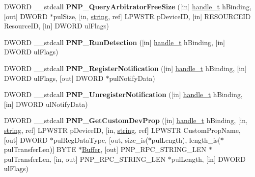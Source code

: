 \begin{DoxyCompactItemize}
D\+W\+O\+RD \+\_\+\+\_\+stdcall {\bfseries P\+N\+P\+\_\+\+Query\+Arbitrator\+Free\+Size} (\mbox{[}in\mbox{]} \hyperlink{interfacevoid}{handle\+\_\+t} h\+Binding, \mbox{[}out\mbox{]} D\+W\+O\+RD $\ast$pul\+Size, \mbox{[}in, \hyperlink{structstring}{string}, ref\mbox{]} L\+P\+W\+S\+TR p\+Device\+ID, \mbox{[}in\mbox{]} R\+E\+S\+O\+U\+R\+C\+E\+ID Resource\+ID, \mbox{[}in\mbox{]} D\+W\+O\+RD ul\+Flags)
\item 
\mbox{\label{interfacepnp_a20456871c401bdb3d2eae7e02f3ee990}} 
D\+W\+O\+RD \+\_\+\+\_\+stdcall {\bfseries P\+N\+P\+\_\+\+Run\+Detection} (\mbox{[}in\mbox{]} \hyperlink{interfacevoid}{handle\+\_\+t} h\+Binding, \mbox{[}in\mbox{]} D\+W\+O\+RD ul\+Flags)
\item 
\mbox{\label{interfacepnp_aacf7965e80e86b22e94cfae52a954480}} 
D\+W\+O\+RD \+\_\+\+\_\+stdcall {\bfseries P\+N\+P\+\_\+\+Register\+Notification} (\mbox{[}in\mbox{]} \hyperlink{interfacevoid}{handle\+\_\+t} h\+Binding, \mbox{[}in\mbox{]} D\+W\+O\+RD ul\+Flags, \mbox{[}out\mbox{]} D\+W\+O\+RD $\ast$pul\+Notify\+Data)
\item 
\mbox{\label{interfacepnp_adbd3a221383cc437b946b8b02bb6f25e}} 
D\+W\+O\+RD \+\_\+\+\_\+stdcall {\bfseries P\+N\+P\+\_\+\+Unregister\+Notification} (\mbox{[}in\mbox{]} \hyperlink{interfacevoid}{handle\+\_\+t} h\+Binding, \mbox{[}in\mbox{]} D\+W\+O\+RD ul\+Notify\+Data)
\item 
\mbox{\label{interfacepnp_ad13c56fdc1aa44c6a1a7736bd92b88ce}} 
D\+W\+O\+RD \+\_\+\+\_\+stdcall {\bfseries P\+N\+P\+\_\+\+Get\+Custom\+Dev\+Prop} (\mbox{[}in\mbox{]} \hyperlink{interfacevoid}{handle\+\_\+t} h\+Binding, \mbox{[}in, \hyperlink{structstring}{string}, ref\mbox{]} L\+P\+W\+S\+TR p\+Device\+ID, \mbox{[}in, \hyperlink{structstring}{string}, ref\mbox{]} L\+P\+W\+S\+TR Custom\+Prop\+Name, \mbox{[}out\mbox{]} D\+W\+O\+RD $\ast$pul\+Reg\+Data\+Type, \mbox{[}out, size\+\_\+is($\ast$pul\+Length), length\+\_\+is($\ast$pul\+Transfer\+Len)\mbox{]} B\+Y\+TE $\ast$\hyperlink{class_buffer}{Buffer}, \mbox{[}out\mbox{]} P\+N\+P\+\_\+\+R\+P\+C\+\_\+\+S\+T\+R\+I\+N\+G\+\_\+\+L\+EN $\ast$pul\+Transfer\+Len, \mbox{[}in, out\mbox{]} P\+N\+P\+\_\+\+R\+P\+C\+\_\+\+S\+T\+R\+I\+N\+G\+\_\+\+L\+EN $\ast$pul\+Length, \mbox{[}in\mbox{]} D\+W\+O\+RD ul\+Flags)
\item 
\mbox{\label{interfacepnp_a1227aa18df2d87233d10aaffb9f92ad6}} 

\end{DoxyCompactItemize}
